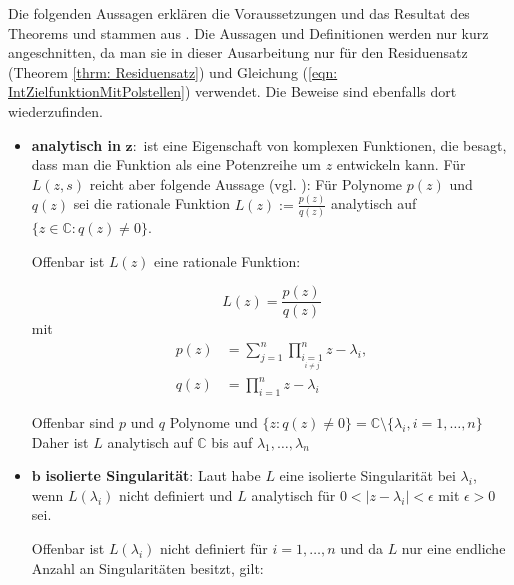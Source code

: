\documentclass[a4paper,12pt]{report}
\newcommand{\C}{\mathbb C}
\newcommand{\1}{\mathds{1}}
\theoremstyle{plain} %
\theoremstyle{definition} %
\theoremstyle{remark}
\begin{document}
            Die folgenden Aussagen erklären die Voraussetzungen und das Resultat des Theorems und stammen aus \cite{complexAnalysis}.
            Die Aussagen und Definitionen werden nur kurz angeschnitten, da man sie in dieser Ausarbeitung nur für den Residuensatz (Theorem \ref{thrm: Residuensatz})
            und Gleichung (\ref{eqn: IntZielfunktionMitPolstellen}) verwendet. Die Beweise sind ebenfalls dort wiederzufinden.
            \begin{itemize}
                  \item \textbf{analytisch in }$\mathbf{z:}$ ist eine Eigenschaft von komplexen Funktionen, die besagt, dass man die Funktion als eine Potenzreihe um $z$ entwickeln kann.
                        Für $L(z, s)$ reicht aber folgende Aussage (vgl. \cite[S. 24]{complexAnalysis}):
                        Für Polynome $p(z)$ und $q(z)$ sei die rationale Funktion $L(z):=\frac{p(z)}{q(z)}$ analytisch auf $\{z\in\C: q(z)\ne 0\}$.
                        
                        Offenbar ist $L(z)$ eine rationale Funktion:

                        $$L(z) = \frac{p(z)}{q(z)}$$
                        mit 
                        \begin{align*}
                              p(z) &= \sum_{j=1}^{n}\prod_{\underset{i\ne j}{i=1}}^{n} z-\lambda_i,\\
                              q(z) &= \prod_{i=1}^{n} z-\lambda_i
                        \end{align*}

                        Offenbar sind $p$ und $q$ Polynome und $\{z: q(z)\ne 0\} = \C\setminus\{\lambda_i, i=1,\dots,n\}$
                        Daher ist $L$ analytisch auf $\C$ bis auf $\lambda_1,\dots,\lambda_n$
                  \item $\mathbf{b}$\textbf{ isolierte Singularität}:
                        Laut \cite[S. 74]{complexAnalysis} habe $L$ eine isolierte Singularität bei $\lambda_i$, wenn $L(\lambda_i)$ nicht definiert
                        und $L$ analytisch für $0<|z-\lambda_i|<\epsilon$ mit $\epsilon>0$ sei.

                        Offenbar ist $L(\lambda_i)$ nicht definiert für $i=1,\dots,n$ und da $L$ nur eine endliche Anzahl an Singularitäten besitzt, gilt:


\end{itemize}
\end{document}
